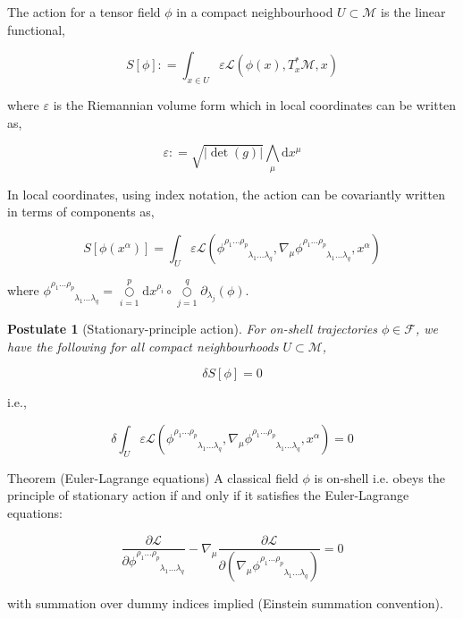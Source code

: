 \documentclass[9pt,handout]{beamer}
\newtheorem{postulate}{Postulate}
\begin{document}
\begin{frame}{}
\begin{definition}[Action]
The action for a tensor field $\phi$ in a compact neighbourhood $U \subset \mathcal{M}$ is the linear functional,

$$S \left[ \phi \right] : = \int_{x \in U} \varepsilon \mathcal{L} \left( \phi \left( x \right), T^*_{x} \mathcal{M}, x \right)$$

where $\varepsilon$ is the Riemannian volume form which in local coordinates can be written as,

$$\varepsilon : = \sqrt{\left\lvert \det \left( g \right) \right\rvert} \bigwedge_{\mu} \text{d}x^\mu$$
\end{definition}

In local coordinates, using index notation, the action can be covariantly written in terms of components as,

$$S \left[ \phi \left( x^\alpha \right) \right] = \int_{U} \varepsilon \mathcal{L} \left( \phi^{\rho_1 \dots \rho_p}_{\phantom{\rho_1 \dots \rho_p} \lambda_1 \dots \lambda_q}, \nabla_\mu \phi^{\rho_1 \dots \rho_p}_{\phantom{\rho_1 \dots \rho_p} \lambda_1 \dots \lambda_q}, x^\alpha \right)$$

where $\phi^{\rho_1 \dots \rho_p}_{\phantom{\rho_1 \dots \rho_p} \lambda_1 \dots \lambda_q} = \underset{i=1}{\overset{p}{\bigcirc}} \text{d}x^{\rho_i} \circ \underset{j=1}{\overset{q}{\bigcirc}} \partial_{\lambda_j} \left( \phi \right)$.
\end{frame}

\begin{frame}
\begin{postulate}[Stationary-principle action]
For on-shell trajectories $\phi \in \mathcal{F}$, we have the following for all compact neighbourhoods $U \subset \mathcal{M}$,

$$\delta S \left[ \phi \right] = 0$$
\end{postulate}

i.e.,

$$\delta \int_{U} \varepsilon \mathcal{L} \left( \phi^{\rho_1 \dots \rho_p}_{\phantom{\rho_1 \dots \rho_p} \lambda_1 \dots \lambda_q}, \nabla_\mu \phi^{\rho_1 \dots \rho_p}_{\phantom{\rho_1 \dots \rho_p} \lambda_1 \dots \lambda_q}, x^\alpha \right) = 0$$


\begin{block}{Theorem (Euler-Lagrange equations)}
A classical field $\phi$ is on-shell i.e. obeys the principle of stationary action if and only if it satisfies the Euler-Lagrange equations:

$$\frac{\partial \mathcal{L}}{\partial \phi^{\rho_1 \dots \rho_p}_{\phantom{\rho_1 \dots \rho_p} \lambda_1 \dots \lambda_q}} - \nabla_\mu \frac{\partial \mathcal{L}}{\partial \left( \nabla_\mu \phi^{\rho_1 \dots \rho_p}_{\phantom{\rho_1 \dots \rho_p} \lambda_1 \dots \lambda_q} \right)} = 0$$

with summation over dummy indices implied (Einstein summation convention).
\end{block}
\end{frame}
\end{document}
